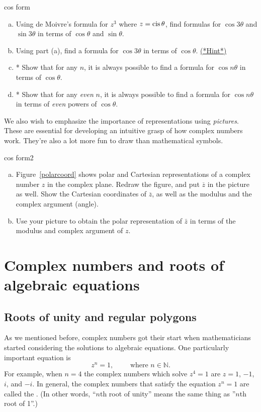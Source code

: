 \begin{exercise}{cos form}
\begin{enumerate}[(a)]
 \item
Using de Moivre's formula for $z^3$ where $z =  \operatorname{cis} \theta$, find formulas for $\cos 3 \theta$ and $\sin 3 \theta$ in terms of $\cos \theta$ and $\sin \theta$.  
\item
Using part (a), find a formula for $\cos 3 \theta$ in terms of $\cos \theta$.  
\hyperref[sec:complex:hints]{(*Hint*)}
\item
* Show that for any $n$, it is always possible to find a formula for $\cos n\theta$ in terms of $\cos \theta$.
\item
* Show that for any \emph{even} $n$, it is always possible to find a formula for $\cos n\theta$ in terms of \emph{even} powers of $\cos \theta$.
\end{enumerate}
\end{exercise}

We also wish to emphasize the importance of representations using \emph{pictures}.  These are essential for developing an intuitive grasp of how complex numbers work. They're also a lot more fun to draw than mathematical symbols. 

\begin{exercise}{cos form2}
\begin{enumerate}[(a)]
\item
Figure~\ref{polarcoord} shows  polar and Cartesian representations of a complex number $z$  in the complex plane.  Redraw the figure, and put $\overline{z}$ in the picture as well. Show the Cartesian coordinates of $\overline{z}$, as well as the modulus and the complex argument (angle).
\item
Use your picture to obtain the polar representation of $\bar{z}$ in terms of the modulus and complex argument of $z$.
\end{enumerate}
\end{exercise}

\section{Complex numbers and roots of algebraic equations}\label{complex_roots}

\subsection{Roots of unity and regular polygons\quad{}}\label{sec:RootsOfUnity}
As we mentioned before, complex numbers got their start when mathematicians started considering the solutions to algebraic  equations. One particularly important equation is
\[z^{n}=1, \qquad \text{ where } n \in \mathbb{N}.\]
For example, when $n=4$ the complex numbers which solve $z^4=1$ are $z=1$, $-1$, $i$, and $-i$. In general, the complex numbers that satisfy the
equation $z^{n}=1$ are called the . (In other words, ``$n$th root of unity'' means the same thing as ''$n$th root of 1''.)

